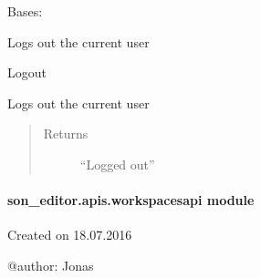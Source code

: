 \documentclass[letterpaper,10pt,english]{sphinxmanual}
\begin{document}

\begin{fulllineitems}
\label{_source/son_editor.apis:son_editor.apis.userserviceapi.Logout}
Bases: 

Logs out the current user

\begin{fulllineitems}
\label{_source/son_editor.apis:son_editor.apis.userserviceapi.Logout.get}
Logout

Logs out the current user
\begin{quote}\begin{description}
\item[{Returns}] \leavevmode
``Logged out''

\end{description}\end{quote}

\end{fulllineitems}


\begin{fulllineitems}
\label{_source/son_editor.apis:son_editor.apis.userserviceapi.Logout.methods}
\end{fulllineitems}


\end{fulllineitems}



\paragraph{son\_editor.apis.workspacesapi module}
\label{_source/son_editor.apis:module-son_editor.apis.workspacesapi}\label{_source/son_editor.apis:son-editor-apis-workspacesapi-module}
Created on 18.07.2016

@author: Jonas
\end{document}
